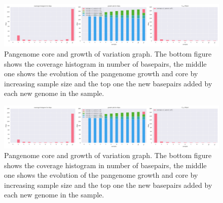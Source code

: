 \begin{figure}[h!]
	\centering
	\includegraphics[angle=90,width=.3\textwidth]{figures/lodelo/lodelo_simon.histgrowth.pdf}
	\caption[Pangenome core and growth of \pggb variation graph.]{Pangenome core and growth of \pggb variation graph. The bottom figure shows the coverage histogram in number of basepairs, the middle one shows the evolution of the pangenome growth and core by increasing sample size and the top one the new basepairs added by each new genome in the sample.}
	\label{fig:panacus_pggb}
\end{figure}%
\begin{figure}[h!]
	\centering
	\includegraphics[angle=90,width=.3\textwidth]{figures/lodelo/lodelo_cactus.histgrowth.pdf}
	\caption[Pangenome core and growth of \mcactus variation graph.]{Pangenome core and growth of \mcactus variation graph. The bottom figure shows the coverage histogram in number of basepairs, the middle one shows the evolution of the pangenome growth and core by increasing sample size and the top one the new basepairs added by each new genome in the sample.}
	\label{fig:panacus_mcactus}
\end{figure}

\printbibliography